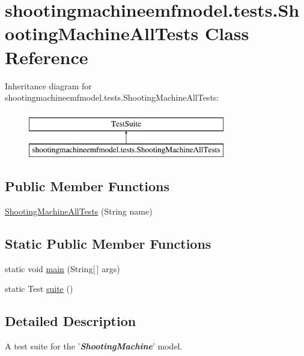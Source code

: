\hypertarget{classshootingmachineemfmodel_1_1tests_1_1_shooting_machine_all_tests}{\section{shootingmachineemfmodel.\-tests.\-Shooting\-Machine\-All\-Tests Class Reference}
\label{classshootingmachineemfmodel_1_1tests_1_1_shooting_machine_all_tests}
}
Inheritance diagram for shootingmachineemfmodel.\-tests.\-Shooting\-Machine\-All\-Tests\-:\begin{figure}[H]
\begin{center}
\leavevmode
\includegraphics[height=2.000000cm]{classshootingmachineemfmodel_1_1tests_1_1_shooting_machine_all_tests}
\end{center}
\end{figure}
\subsection*{Public Member Functions}
\begin{DoxyCompactItemize}
\item 
\hyperlink{classshootingmachineemfmodel_1_1tests_1_1_shooting_machine_all_tests_a18f13b5d41b1997697eb6da222896f17}{Shooting\-Machine\-All\-Tests} (String name)
\end{DoxyCompactItemize}
\subsection*{Static Public Member Functions}
\begin{DoxyCompactItemize}
\item 
static void \hyperlink{classshootingmachineemfmodel_1_1tests_1_1_shooting_machine_all_tests_a1867c386459553e96c37e3ac7aa88cd3}{main} (String\mbox{[}$\,$\mbox{]} args)
\item 
static Test \hyperlink{classshootingmachineemfmodel_1_1tests_1_1_shooting_machine_all_tests_a48bdc83b6bebbdccac78dde925956d56}{suite} ()
\end{DoxyCompactItemize}


\subsection{Detailed Description}
A test suite for the '{\itshape {\bfseries Shooting\-Machine}}' model.


